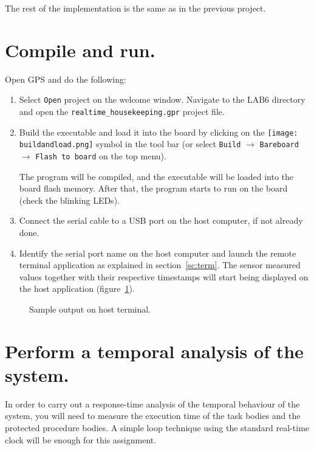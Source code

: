 The rest of the implementation is the same as in the previous project.

\section{Compile and run.}

Open GPS and do the following:
\begin{enumerate}
\item Select {\tt Open} project on the welcome window. Navigate to the LAB6 directory and open the {\tt realtime\_housekeeping.gpr} project file.
\item Build the executable and load it into the board by clicking on the \hbox{\texttt{[image: buildandload.png]}} symbol in the tool bar (or select {\tt Build} $\rightarrow$ {\tt Bareboard} $\rightarrow$ {\tt Flash to board} on the top menu).

The program will be compiled, and the executable will be loaded into the board flash memory. After that, the program starts to run on the board (check the blinking LEDs).
\item Connect the serial cable to a USB port on the host computer, if not already done.
\item Identify the serial port name on the host computer and launch the remote terminal application as explained in section~\ref{sc:term}.  The sensor measured values together with their respective timestamps will start being displayed on the host application (figure~\ref{fig:output}).
\end{enumerate}

\begin{figure}[h]
            \caption{Sample output on host terminal.}
            \label{fig:output}
\end{figure}

\section{Perform a temporal analysis of the system.}\label{sc:ta}

In order to carry out a response-time analysis of the temporal behaviour of the system, you will need to measure the execution time of the task bodies and the protected procedure bodies. A simple loop technique using the standard real-time clock will be enough for this assignment.

